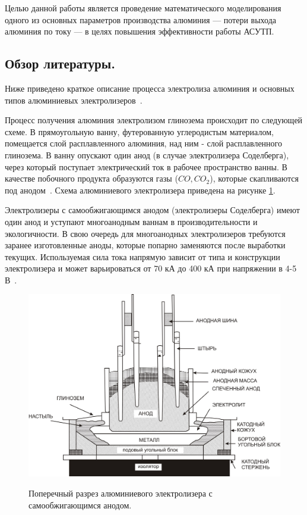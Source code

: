 \documentclass{article}
\begin{document}
Целью данной работы является проведение математического моделирования одного из основных параметров производства алюминия — потери выхода алюминия по току — в целях повышения эффективности работы АСУТП.

\subsection*{Обзор литературы.}

Ниже приведено краткое описание процесса электролиза алюминия и основных типов алюминиевых электролизеров~\cite{litlink:bibliogr}.

Процесс получения алюминия электролизом глинозема происходит по следующей схеме. В прямоугольную ванну, футерованную углеродистым материалом, помещается слой расплавленного алюминия, над ним - слой расплавленного глинозема. В ванну опускают один анод (в случае электролизера Соделберга), через который поступает электрический ток в рабочее пространство ванны. В качестве побочного продукта образуются газы ($CO, CO_2$), которые скапливаются под анодом~\cite{litlink:bibliogr}. Схема алюминиевого электролизера приведена на рисунке \ref{fig:elec}.

Электролизеры с самообжигающимся анодом (электролизеры Соделберга) имеют один анод и уступают многоанодным ваннам в производительности и экологичности. В свою очередь для многоанодных электролизеров требуются заранее изготовленные аноды, которые попарно заменяются после выработки текущих. Используемая сила тока напрямую зависит от типа и конструкции электролизера и может варьироваться от 70 кА до 400 кА при напряжении в 4-5 В~\cite{litlink:bibliogr}.

\begin{figure}[H]
	\centering
	\includegraphics[width=0.8\linewidth]{Electrolizer.jpg}
	\caption[]{}
	\label{fig:elec}
	Поперечный разрез алюминиевого электролизера с самообжигающимся анодом.
\end{figure}
\end{document}
